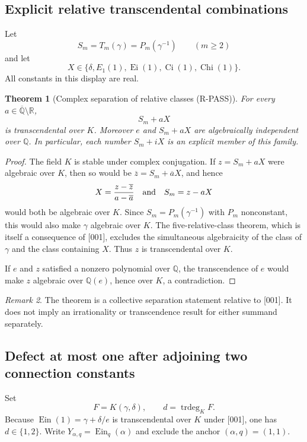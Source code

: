 \documentclass[11pt]{article}
\theoremstyle{keio}
\newtheorem{theorem}{Theorem}[section]
\theoremstyle{definition}
\theoremstyle{remark}
\newtheorem{remark}[theorem]{Remark}
\newcommand{\Q}{\mathbb Q}
\newcommand{\Qbar}{\overline{\mathbb Q}}
\newcommand{\R}{\mathbb R}
\newcommand{\Ein}{\operatorname{Ein}}
\newcommand{\Ei}{\operatorname{Ei}}
\newcommand{\Ci}{\operatorname{Ci}}
\newcommand{\Chi}{\operatorname{Chi}}
\newcommand{\trdeg}{\operatorname{trdeg}}
\newcommand{\RPASS}{\textcolor{keioxblue}{\textsf{R-PASS}}}
\begin{document}
\subsection{Explicit relative transcendental combinations}

Let
\[
 S_m=T_m(\gamma)=P_m(\gamma^{-1})\qquad(m\ge2)
\]
and let
\[
 X\in\{\delta,E_1(1),\Ei(1),\Ci(1),\Chi(1)\}.
\]
All constants in this display are real.

\begin{theorem}[Complex separation of relative classes (\RPASS)]
\label{thm:transfer-complex-combinations}
For every \(a\in\Qbar\setminus\R\),
\[
 S_m+aX
\]
is transcendental over \(K\).  Moreover \(e\) and \(S_m+aX\) are
algebraically independent over \(\Q\).  In particular, each number
\(S_m+iX\) is an explicit member of this family.
\end{theorem}

\begin{proof}
The field \(K\) is stable under complex conjugation.  If
\(z=S_m+aX\) were algebraic over \(K\), then so would be
\(\overline z=S_m+\overline aX\), and hence
\[
 X=\frac{z-\overline z}{a-\overline a}
 \quad\hbox{and}\quad S_m=z-aX
\]
would both be algebraic over \(K\).  Since
\(S_m=P_m(\gamma^{-1})\) with \(P_m\) nonconstant, this would also make
\(\gamma\) algebraic over \(K\).  The five-relative-class theorem, which
is itself a consequence of [001], excludes the simultaneous algebraicity
of the class of \(\gamma\) and the class containing \(X\).  Thus \(z\) is
transcendental over \(K\).

If \(e\) and \(z\) satisfied a nonzero polynomial over \(\Q\), the
transcendence of \(e\) would make \(z\) algebraic over \(\Q(e)\), hence
over \(K\), a contradiction.
\end{proof}

\begin{remark}
The theorem is a collective separation statement relative to [001].  It
does not imply an irrationality or transcendence result for either summand
separately.
\end{remark}

\subsection{Defect at most one after adjoining two connection constants}

Set
\[
 F=K(\gamma,\delta),
 \qquad d=\trdeg_KF.
\]
Because \(\Ein(1)=\gamma+\delta/e\) is transcendental over \(K\) under
[001], one has \(d\in\{1,2\}\).  Write
\(Y_{\alpha,q}=\Ein_q(\alpha)\) and exclude the anchor
\((\alpha,q)=(1,1)\).
\end{document}
